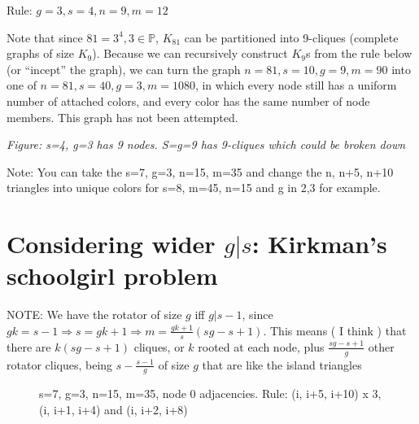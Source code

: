 \documentclass[11pt, oneside]{article} 	%
\begin{document}
Rule: $g=3, s=4, n=9, m=12$

Note that since $81 = 3^4, 3 \in \mathbb{P}$, $K_{81}$ can be partitioned into 9-cliques (complete graphs of size $K_9$). Because we can recursively construct $K_9$s from the rule below (or ``incept'' the graph), we can turn the graph $n=81, s=10, g=9, m=90$ into one of $n=81, s=40, g=3, m=1080$, in which every node still has a uniform number of attached colors, and every color has the same number of node members. This graph has not been attempted.

\emph{Figure: s=4, g=3 has 9 nodes. S=g=9 has 9-cliques which could be broken down }

Note: You can take the s=7, g=3, n=15, m=35 and change the n, n+5, n+10 triangles into unique colors for s=8, m=45, n=15 and g in {2,3} for example. 


\section{Considering wider $g|s$: Kirkman's schoolgirl problem}

NOTE: We have the rotator of size $g$ iff $g | s-1$, since $gk = s - 1 \Rightarrow s = gk+1 \Rightarrow m = \frac{gk+1}{s}(sg-s+1).$ This means ( I think ) that there are $k(sg-s+1)$ cliques, or $k$ rooted at each node, plus $\frac{sg-s+1}{g}$ other rotator cliques, being $s - \frac{s-1}g$ of size $g$ that are like the island triangles





\begin{figure}[!htb]
\centering
{}
\label{fig:s7g3}
\caption{s=7, g=3, n=15, m=35, node 0 adjacencies. Rule: (i, i+5, i+10) x 3, (i, i+1, i+4) and (i, i+2, i+8)}
\end{figure}
\end{document}
